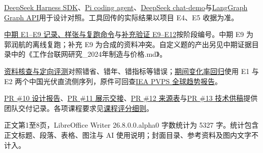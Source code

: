 \documentclass[UTF8,12pt,fontset=none]{ctexart}
\newcommand{\subhead}[1]{\par\addvspace{8pt}{\color{zblue}\fontsize{14}{18}\selectfont\bfseries #1\par}\vspace{1pt}}
\begin{document}
\href{https://github.com/deepseek-ai/deepseek-harness/tree/master/packages/sdk}{DeepSeek Harness SDK}、\href{https://github.com/earendil-works/pi/tree/main/packages/coding-agent}{Pi coding agent}、\href{https://github.com/deepseek-ai/chat-demo}{DeepSeek chat-demo}与\href{https://docs.langchain.com/oss/python/langgraph/graph-api}{LangGraph Graph API}用于设计对照。工具回传的实际结果以项目 E4、E5 收据为准。\par
\href{https://github.com/BrockPhlin/industry-report-harness/tree/cbbb1df/presentations/02-midterm/evidence}{中期 E1–E9 记录、样张与复跑命令}与\href{https://github.com/BrockPhlin/industry-report-harness/tree/7876b7c/presentations/03-final/evidence}{补充验证 E9–E12}按阶段编号。中期 E9 为郭润航的离线复跑；补充 E9 为合成的资料冲突。自定义题的产出另见中期证据目录中的《工作台联网研究\_2024年制造与价格.md》。\par
\href{https://github.com/BrockPhlin/industry-report-harness/blob/d41a7c7/docs/\%E6\%8A\%A5\%E5\%91\%8A\%E6\%A0\%B8\%E6\%9F\%A5\%E4\%B8\%8E\%E4\%BF\%AE\%E8\%AE\%A2.md}{资料核查与定向评测}对照错省、错年、错指标等错误；\href{https://github.com/BrockPhlin/industry-report-harness/blob/d41a7c7/code/tests\_midterm/test\_series\_growth.py}{期间变化率回归}使用 E1 与 E2 两个中国光伏直流侧序列，原件可回查\href{https://iea-pvps.org/trends\_reports/trends-2026/}{IEA PVPS 全球趋势报告}。\par
\href{https://github.com/BrockPhlin/industry-report-harness/pull/10}{PR \#10 设计报告}、\href{https://github.com/BrockPhlin/industry-report-harness/pull/11}{PR \#11 展示交接}、\href{https://github.com/BrockPhlin/industry-report-harness/pull/12}{PR \#12 来源表}与\href{https://github.com/BrockPhlin/industry-report-harness/pull/13}{PR \#13 技术供稿}提供团队交付记录。各项课程要求见\href{https://github.com/BrockPhlin/industry-report-harness/blob/7876b7c/materials/references/\%E8\%AF\%BE\%E7\%A8\%8B\%E6\%8A\%A5\%E5\%91\%8A\%E4\%B8\%8E\%E8\%AF\%84\%E5\%88\%86\%E7\%BB\%86\%E5\%88\%99.md}{课程评分细则}。\par
\subhead{篇幅统计}
正文第1至8页，LibreOffice Writer 26.8.0.0.alpha0 字数统计为 5327 字。统计包含正文标题、段落、表格、图注与 AI 使用说明；封面目录、参考资料及图内文字不计入。
\end{document}
